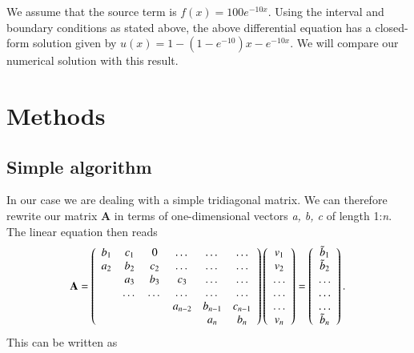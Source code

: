\documentclass{article}
\begin{document}
\begin{multicols}{2}
We assume that the source term is $f(x) = 100e^{-10x}$. Using the interval and boundary conditions as stated above, the above differential equation has a closed-form  solution given by $u(x) = 1-(1-e^{-10})x-e^{-10x}$. We will compare our numerical solution with this result. 





\section{Methods}
\subsection{Simple algorithm}
In our case we are dealing with a simple tridiagonal matrix. We can therefore rewrite our matrix \textbf{A} in terms of one-dimensional vectors \textit{a, b, c} of length 1:\textit{n}. The linear equation then reads
\begin{equation}
    {\bf A} = \left(\begin{array}{cccccc}
                           b_1& c_1 & 0 &\dots   & \dots &\dots \\
                           a_2 & b_2 & c_2 &\dots &\dots &\dots \\
                           & a_3 & b_3 & c_3 & \dots & \dots \\
                           & \dots   & \dots &\dots   &\dots & \dots \\
                           &   &  &a_{n-2}  &b_{n-1}& c_{n-1} \\
                           &    &  &   &a_n & b_n \\
                      \end{array} \right)\left(\begin{array}{c}
                           v_1\\
                           v_2\\
                           \dots \\
                          \dots  \\
                          \dots \\
                           v_n\\
                      \end{array} \right)
  =\left(\begin{array}{c}
                           \tilde{b}_1\\
                           \tilde{b}_2\\
                           \dots \\
                           \dots \\
                          \dots \\
                           \tilde{b}_n\\
                      \end{array} \right).
\end{equation}
This can be written as


\end{multicols}
\end{document}
